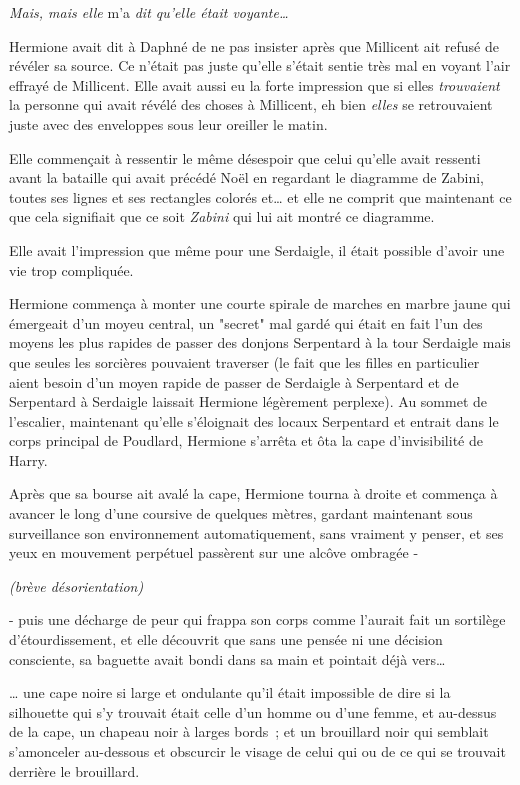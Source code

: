 \emph{Mais, mais elle} m'a \emph{dit qu'elle était voyante…}

Hermione avait dit à Daphné de ne pas insister après que Millicent ait refusé de révéler sa source. Ce n'était pas juste qu'elle s'était sentie très mal en voyant l'air effrayé de Millicent. Elle avait aussi eu la forte impression que si elles \emph{trouvaient} la personne qui avait révélé des choses à Millicent, eh bien \emph{elles} se retrouvaient juste avec des enveloppes sous leur oreiller le matin.

Elle commençait à ressentir le même désespoir que celui qu'elle avait ressenti avant la bataille qui avait précédé Noël en regardant le diagramme de Zabini, toutes ses lignes et ses rectangles colorés et… et elle ne comprit que maintenant ce que cela signifiait que ce soit \emph{Zabini} qui lui ait montré ce diagramme.

Elle avait l'impression que même pour une Serdaigle, il était possible d'avoir une vie trop compliquée.

Hermione commença à monter une courte spirale de marches en marbre jaune qui émergeait d'un moyeu central, un "secret" mal gardé qui était en fait l'un des moyens les plus rapides de passer des donjons Serpentard à la tour Serdaigle mais que seules les sorcières pouvaient traverser (le fait que les filles en particulier aient besoin d'un moyen rapide de passer de Serdaigle à Serpentard et de Serpentard à Serdaigle laissait Hermione légèrement perplexe). Au sommet de l'escalier, maintenant qu'elle s'éloignait des locaux Serpentard et entrait dans le corps principal de Poudlard, Hermione s'arrêta et ôta la cape d'invisibilité de Harry.

Après que sa bourse ait avalé la cape, Hermione tourna à droite et commença à avancer le long d'une coursive de quelques mètres, gardant maintenant sous surveillance son environnement automatiquement, sans vraiment y penser, et ses yeux en mouvement perpétuel passèrent sur une alcôve ombragée -

\emph{(brève désorientation)}

- puis une décharge de peur qui frappa son corps comme l'aurait fait un sortilège d'étourdissement, et elle découvrit que sans une pensée ni une décision consciente, sa baguette avait bondi dans sa main et pointait déjà vers…

… une cape noire si large et ondulante qu'il était impossible de dire si la silhouette qui s'y trouvait était celle d'un homme ou d'une femme, et au-dessus de la cape, un chapeau noir à larges bords~; et un brouillard noir qui semblait s'amonceler au-dessous et obscurcir le visage de celui qui ou de ce qui se trouvait derrière le brouillard.

